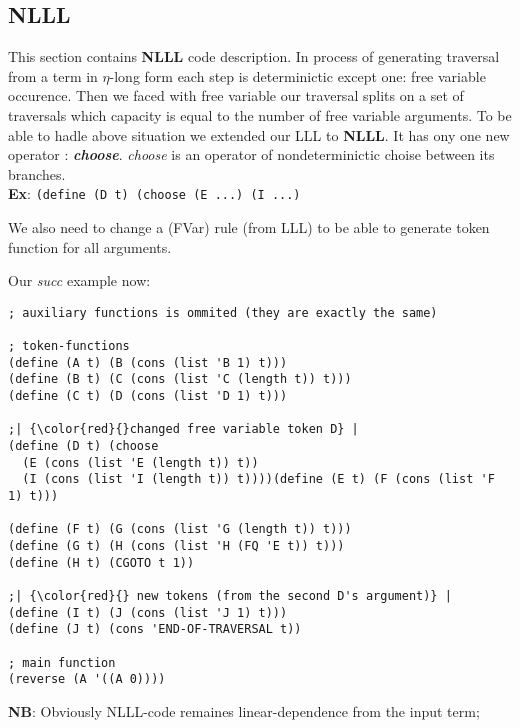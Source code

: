 \documentclass[a4paper, 10pt]{article}
\begin{document}
\newpage
\subsection{\textbf{NLLL}}
This section contains \textbf{NLLL} code description. In process of generating traversal from a term in $\eta$-long form each step is determinictic except one: free variable occurence. Then we faced with free variable our traversal splits on a set of traversals which capacity is equal to the number of free variable arguments. To be able to hadle above situation we extended our LLL to \textbf{NLLL}. It has ony one new operator : \textit{\textbf{choose}}. \textit{choose} is an operator of nondeterminictic choise between its branches. \\ \textbf{Ex}: \texttt{(define (D t) (choose (E ...) (I ...)}

We also need to change a (FVar) rule (from LLL) to be able to generate token function for all arguments.

Our \textit{succ} example now:
\begin{verbatim}
; auxiliary functions is ommited (they are exactly the same)

; token-functions
(define (A t) (B (cons (list 'B 1) t)))
(define (B t) (C (cons (list 'C (length t)) t)))
(define (C t) (D (cons (list 'D 1) t)))

;| {\color{red}{}changed free variable token D} |
(define (D t) (choose 
  (E (cons (list 'E (length t)) t))
  (I (cons (list 'I (length t)) t))))(define (E t) (F (cons (list 'F 1) t)))

(define (F t) (G (cons (list 'G (length t)) t)))
(define (G t) (H (cons (list 'H (FQ 'E t)) t)))
(define (H t) (CGOTO t 1))

;| {\color{red}{} new tokens (from the second D's argument)} |
(define (I t) (J (cons (list 'J 1) t)))
(define (J t) (cons 'END-OF-TRAVERSAL t))

; main function
(reverse (A '((A 0))))
\end{verbatim}

\textbf{NB}: Obviously NLLL-code remaines linear-dependence from the input term;


\newpage
\end{document}
